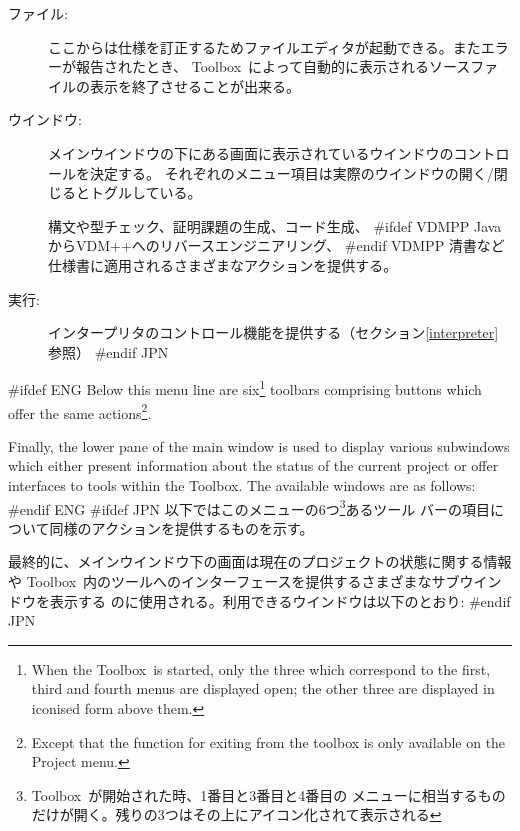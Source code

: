 \documentclass[\pformat,12pt]{article}
\newcommand{\Toolbox}{Toolbox}
\newcommand{\Toolbox}{Toolbox}
\newcommand{\guicmd}[1]{{\sf #1}}
\newcommand{\guicmd}[1]{{\gt #1}}
\begin{document}
\begin{description}
\item[\guicmd{ファイル}:]
  ここからは仕様を訂正するためファイルエディタが起動できる。またエラーが報告されたとき、
  \Toolbox\ によって自動的に表示されるソースファイルの表示を終了させることが出来る。

\item[\guicmd{ウインドウ}:]
  メインウインドウの下にある画面に表示されているウインドウのコントロールを決定する。
  それぞれのメニュー項目は実際のウインドウの開く/閉じるとトグルしている。

  構文や型チェック、証明課題の生成、コード生成、
#ifdef VDMPP 
JavaからVDM++へのリバースエンジニアリング、
#endif VDMPP 
  清書など仕様書に適用されるさまざまなアクションを提供する。

\item[\guicmd{実行}:]
  インタープリタのコントロール機能を提供する（セクション\ref{interpreter}参照）
#endif JPN
\end{description}

#ifdef ENG
  Below this menu line are six\footnote{When the \Toolbox\ is started,
  only the three which correspond to the first, third and fourth menus are
  displayed open; the other three are displayed in iconised form above
  them.} toolbars comprising buttons which offer the same
  actions\footnote{Except that the function for exiting from the toolbox
  is only available on the \guicmd{Project} menu.}.
  
  Finally, the lower pane of the main window is used to display various
  subwindows which either present information about the status of the
  current project or offer interfaces to tools within the \Toolbox. The
  available windows are as follows:
#endif ENG
#ifdef JPN
  以下ではこのメニューの6つ\footnote{\Toolbox\ が開始された時、1番目と3番目と4番目の
  メニューに相当するものだけが開く。残りの3つはその上にアイコン化されて表示される}あるツール
  バーの項目について同様のアクションを提供するものを示す。
  
  最終的に、メインウインドウ下の画面は現在のプロジェクトの状態に関する情報や
  \Toolbox\ 内のツールへのインターフェースを提供するさまざまなサブウインドウを表示する
  のに使用される。利用できるウインドウは以下のとおり:
#endif JPN
\end{document}
